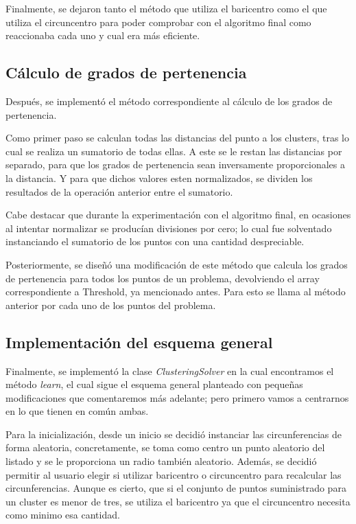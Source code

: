 \documentclass[conference,a4paper]{IEEEtran}
\begin{document}
Finalmente, se dejaron tanto el método que utiliza el baricentro como el que utiliza el circuncentro para poder comprobar con el algoritmo final como reaccionaba cada uno y cual era más eficiente.

\subsection{Cálculo de grados de pertenencia}

Después, se implementó el método correspondiente al cálculo de los grados de pertenencia.

Como primer paso se calculan todas las distancias del punto a los clusters, tras lo cual se realiza un sumatorio de todas ellas. A este se le restan las distancias por separado, para que los grados de pertenencia sean inversamente proporcionales a la distancia. Y para que dichos valores esten normalizados, se dividen los resultados de la operación anterior entre el sumatorio.

Cabe destacar que durante la experimentación con el algoritmo final, en ocasiones al intentar normalizar se producían divisiones por cero; lo cual fue solventado instanciando el sumatorio de los puntos con una cantidad despreciable.

Posteriormente, se diseñó una modificación de este método que calcula los grados de pertenencia para todos los puntos de un problema, devolviendo el array correspondiente a Threshold, ya mencionado antes. Para esto se llama al método anterior por cada uno de los puntos del problema.

\subsection{Implementación del esquema general}

Finalmente, se implementó la clase \textit{ClusteringSolver} en la cual encontramos el método \textit{learn}, el cual sigue el esquema general planteado con pequeñas modificaciones que comentaremos más adelante; pero primero vamos a centrarnos en lo que tienen en común ambas.

Para la inicialización, desde un inicio se decidió instanciar las circunferencias de forma aleatoria, concretamente, se toma como centro un punto aleatorio del listado y se le proporciona un radio también aleatorio. Además, se decidió permitir al usuario elegir si utilizar baricentro o circuncentro para recalcular las circunferencias. Aunque es cierto, que si el conjunto de puntos suministrado para un cluster es menor de tres, se utiliza el baricentro ya que el circuncentro necesita como minimo esa cantidad.
\end{document}
